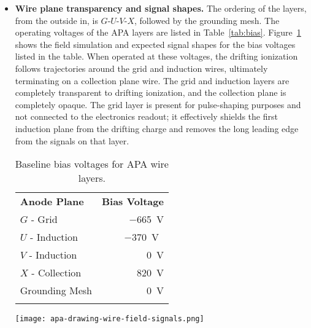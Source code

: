 \begin{itemize}
\item \textbf{Wire plane transparency and signal shapes.}  The ordering of the layers, from the outside in, is $G$-$U$-$V$-$X$, followed by the grounding mesh. The operating voltages of the APA layers are listed in Table~\ref{tab:bias}.  Figure~\ref{fig:apa-fields} shows the field simulation and expected signal shapes for the bias voltages listed in the table.  When operated at these voltages, the drifting ionization follows trajectories around the grid and induction wires, ultimately terminating on a collection plane wire. The grid and induction layers are completely transparent to drifting ionization, and the collection plane is completely opaque.  The grid layer is present for pulse-shaping purposes and not connected to the electronics readout; it effectively shields the first induction plane from the drifting charge and removes the long leading edge from the signals on that layer. 

\begin{table}[ht]
\begin{minipage}[b]{0.46\linewidth}
\centering
\begin{tabular}{ l  r }
    \hline
    \textbf{Anode Plane} & \textbf{Bias Voltage} \\ \toprowrule
	$G$ - Grid & \SI{-665}{V} \\ \colhline
	$U$ - Induction & \SI{-370}{V{}} \\ \colhline
	$V$ - Induction & \SI{0}{V} \\ \colhline
	$X$ - Collection & \SI{820}{V} \\ \colhline
	Grounding Mesh & \SI{0}{V} \\ \colhline
    \end{tabular}
    \caption{Baseline bias voltages for APA wire layers.}
    \label{tab:bias}
\end{minipage}\hfill
\begin{minipage}[t]{0.5\linewidth}
\centering
\texttt{[image: apa-drawing-wire-field-signals.png]}
\label{fig:apa-fields}
\end{minipage}
\end{table}


\end{itemize}
